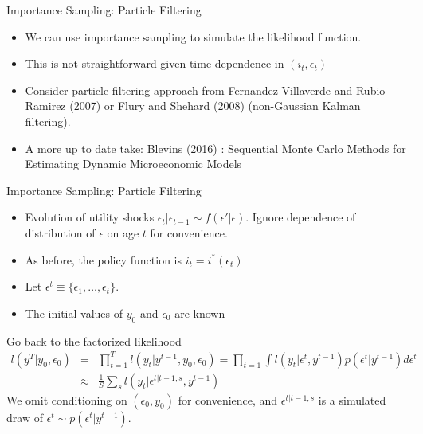 \begin{frame}{Importance Sampling: Particle Filtering}
\begin{itemize}
\item We can use importance sampling to simulate the likelihood function. 
\item This is not straightforward given time dependence in $(i_t,\epsilon_t)$
\item Consider particle filtering approach from Fernandez-Villaverde and Rubio-Ramirez (2007) or Flury and Shehard (2008) (non-Gaussian Kalman filtering).
\item A more up to date take: Blevins (2016) : Sequential {Monte Carlo} Methods for Estimating Dynamic Microeconomic Models
\end{itemize}
\end{frame}

\begin{frame}{Importance Sampling: Particle Filtering}
\begin{itemize}
\item Evolution of utility shocks $\epsilon_t | \epsilon_{t-1} \sim f(\epsilon' | \epsilon)$. Ignore dependence of distribution of $\epsilon$ on age $t$ for convenience.
\item As before, the policy function is $i_t = i^{*}(\epsilon_t)$
\item Let $\epsilon^t \equiv \{\epsilon_1,\ldots,\epsilon_t\}$.
\item The initial values of $y_0$ and $\epsilon_0$ are known
\end{itemize}
Go back to the factorized likelihood
\begin{eqnarray*}
l(y^T | y_0,\epsilon_0 ) &=& \prod_{t=1}^T l (y_t | y^{t-1},y_0,\epsilon_0) = \prod_{t=1} \int l (y_t |\epsilon^t, y^{t-1}) p(\epsilon^t | y^{t-1} )d \epsilon^t  \\
&\approx& \frac{1}{S} \sum_s l(y_t | \epsilon^{t | t-1,s},y^{t-1})
\end{eqnarray*}
We omit conditioning on $(\epsilon_0, y_0)$ for convenience, and $\epsilon^{t | t-1,s}$ is a simulated draw of $\epsilon^t \sim p(\epsilon^t | y^{t-1})$.
\end{frame}



